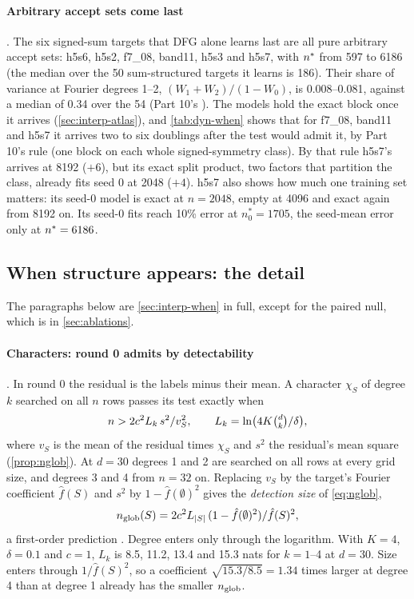 \paragraph{Arbitrary accept sets come last} . The six signed-sum targets that DFG alone learns last are all pure arbitrary accept sets: h5s6, h5s2, f7\_08, band11, h5s3 and h5s7, with $n^{*}$ from 597 to 6186 (the median over the 50 sum-structured targets it learns is 186). Their share of variance at Fourier degrees 1--2, $(W_1+W_2)/(1-W_0)$, is 0.008--0.081, against a median of 0.34 over the 54 (Part 10's ). The models hold the exact block once it arrives (\cref{sec:interp-atlas}), and \cref{tab:dyn-when} shows that for f7\_08, band11 and h5s7 it arrives two to six doublings after the test would admit it, by Part 10's rule (one block on each whole signed-symmetry class). By that rule h5s7's arrives at 8192 ($+6$), but its exact split product, two factors that partition the class, already fits seed 0 at 2048 ($+4$). h5s7 also shows how much one training set matters: its seed-0 model is exact at $n=2048$, empty at 4096 and exact again from 8192 on. Its seed-0 fits reach 10\% error at $n^*_0=1705$, the seed-mean error only at $n^{*}=6186$.

\subsection{When structure appears: the detail}\label{app:interp-when}

The paragraphs below are \cref{sec:interp-when} in full, except for the paired null, which is in \cref{sec:ablations}.

\paragraph{Characters: round 0 admits by detectability} . In round 0 the residual is the labels minus their mean. A character $\chi_S$ of degree $k$ searched on all $n$ rows passes its test exactly when
\[
n>2c^2L_k\,s^2/v_S^2,\qquad L_k=\ln\bigl(4K\tbinom dk/\delta\bigr),
\]
where $v_S$ is the mean of the residual times $\chi_S$ and $s^2$ the residual's mean square (\cref{prop:nglob}). At $d=30$ degrees 1 and 2 are searched on all rows at every grid size, and degrees 3 and 4 from $n=32$ on. Replacing $v_S$ by the target's Fourier coefficient $\hat f(S)$ and $s^2$ by $1-\hat f(\emptyset)^2$ gives the \emph{detection size} of \cref{eq:nglob},
\[
n_{\rm glob}(S)=2c^2L_{|S|}\,(1-\hat f(\emptyset)^2)/\hat f(S)^2,
\]
a first-order prediction . Degree enters only through the logarithm. With $K=4$, $\delta=0.1$ and $c=1$, $L_k$ is 8.5, 11.2, 13.4 and 15.3 nats for $k=1$--4 at $d=30$. Size enters through $1/\hat f(S)^2$, so a coefficient $\sqrt{15.3/8.5}=1.34$ times larger at degree 4 than at degree 1 already has the smaller $n_{\rm glob}$.

